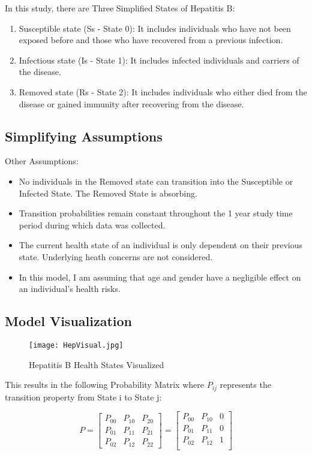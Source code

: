 \documentclass{article}
\begin{document}
In this study, there are Three Simplified States of Hepatitis B:

\begin{enumerate}
\item Susceptible state (Ss - State 0): It includes individuals who have not been exposed before and those who have recovered from a previous infection. 
\item Infectious state (Is - State 1): It includes infected individuals and carriers of the disease. 
\item Removed state (Rs - State 2): It includes individuals who either died from the disease or gained immunity after recovering from the disease. 
\end{enumerate}

\subsection{Simplifying Assumptions}
Other Assumptions:
\begin{itemize}
    \item No individuals in the Removed state can transition into the Susceptible or Infected State. The Removed State is absorbing.
    \item Transition probabilities remain constant throughout the 1 year study time period during which data was collected.
    \item The current health state of an individual is only dependent on their previous state. Underlying heath concerns are not considered.
    \item In this model, I am assuming that age and gender have a negligible effect on an individual's health risks. 
\end{itemize}

\subsection{Model Visualization}
\begin{figure}[htp]
    \centering
    \texttt{[image: HepVisual.jpg]}
    \caption{Hepatitis B Health States Visualized}
\end{figure} 

This results in the following Probability Matrix where $P_{ij}$ represents the transition property from State i to State j: 

\begin{equation*} 
P = 
    \begin{bmatrix}
    P_{00} & P_{10} & P_{20} \\
    P_{01} & P_{11} & P_{21} \\
    P_{02} & P_{12} & P_{22}
    \end{bmatrix}
=
    \begin{bmatrix}
    P_{00} & P_{10} & 0 \\
    P_{01} & P_{11} & 0 \\
    P_{02} & P_{12} & 1 \\
    
    \end{bmatrix}
\end{equation*}
\end{document}
